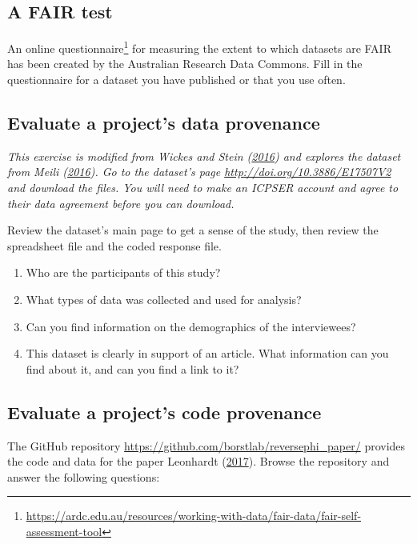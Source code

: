 \documentclass[
]{krantz}
\providecommand{\tightlist}{%
  \setlength{\itemsep}{0pt}\setlength{\parskip}{0pt}}
\renewcommand{\href}[2]{#2\footnote{\url{#1}}}
\begin{document}
\hypertarget{provenance-ex-fair-test}{%
\subsection{A FAIR test}\label{provenance-ex-fair-test}}

An \href{https://ardc.edu.au/resources/working-with-data/fair-data/fair-self-assessment-tool}{online questionnaire}
for measuring the extent to which datasets are FAIR
has been created by the Australian Research Data Commons.
Fill in the questionnaire for a dataset you have published or that you use often.

\hypertarget{provenance-ex-understand-project}{%
\subsection{Evaluate a project's data provenance}\label{provenance-ex-understand-project}}

\emph{This exercise is modified from Wickes and Stein (\protect\hyperlink{ref-Wick2016}{2016}) and explores the dataset from Meili (\protect\hyperlink{ref-Meil2015}{2016}).
Go to the dataset's page \url{http://doi.org/10.3886/E17507V2} and download the files.
You will need to make an ICPSER account and agree to their data agreement before you can download.}

Review the dataset's main page to get a sense of the study,
then review the spreadsheet file and the coded response file.

\begin{enumerate}
\def\labelenumi{\arabic{enumi}.}
\tightlist
\item
  Who are the participants of this study?
\item
  What types of data was collected and used for analysis?
\item
  Can you find information on the demographics of the interviewees?
\item
  This dataset is clearly in support of an article.
  What information can you find about it, and can you find a link to it?
\end{enumerate}

\hypertarget{provenance-ex-eval-code}{%
\subsection{Evaluate a project's code provenance}\label{provenance-ex-eval-code}}

The GitHub repository \url{https://github.com/borstlab/reversephi_paper/} provides the code and data for the paper Leonhardt (\protect\hyperlink{ref-Leon2017}{2017}).
Browse the repository and answer the following questions:
\end{document}
